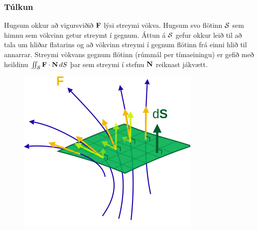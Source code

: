 \subsubsection{Túlkun \rtask{}}
 Hugsum okkur að vigursviðið $\mbox{${\bf F}$}$ lýsi streymi
vökva.  Hugsum svo flötinn $\cal S$ sem himnu sem vökvinn getur
streymt í gegnum.  Áttun á $\cal S$ gefur okkur leið til að tala um
hliðar flatarins og að vökvinn streymi í gegnum flötinn frá
einni hlið til annarrar.  Streymi vökvans gegnum flötinn (rúmmál per
tímaeiningu) er gefið með heildinu $\int\!\!\!\int_{\cal S} \mbox{${\bf F}$}\cdot\mbox{${\bf N}$}\,dS$
  þar sem streymi í stefnu $\mbox{${\bf N}$}$ reiknast jákvætt.

\begin {figure}[h!]
 \centering
            \includegraphics[width=0.45\linewidth]{flux.png}
            \caption*{}
\end {figure}




